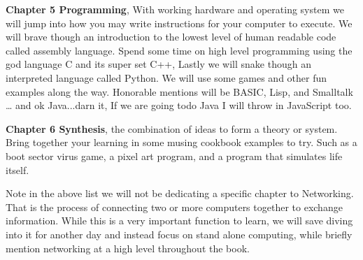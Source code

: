 \begin{flushleft}
\textbf{Chapter 5 Programming}, With working hardware and operating system we will jump into how you may write instructions for your computer to execute. We will brave though an introduction to the lowest level of human readable code called assembly language. Spend some time on high level programming using the god language C and its super set C++, Lastly we will snake though an interpreted language called Python. We will use some games and other fun examples along the way. Honorable mentions will be BASIC, Lisp, and Smalltalk … and ok Java...darn it, If we are going todo Java I will throw in JavaScript too.\newline

\textbf{Chapter 6 Synthesis}, the combination of ideas to form a theory or system. Bring together your learning in some musing cookbook examples to try. Such as a boot sector virus game, a pixel art program, and a program that simulates life itself.
\end{flushleft}

Note in the above list we will not be dedicating a specific chapter to Networking. That is the process of connecting two or more computers together to exchange information. While this is a very important function to learn, we will save diving into it for another day and instead focus on stand alone computing, while briefly mention networking at a high level throughout the book.

